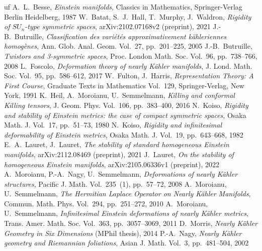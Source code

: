 \documentclass[12pt]{scrartcl}
\theoremstyle{plain}
\theoremstyle{definition}
\begin{document}
\begin{thebibliography}{uf}
 A.~L.~Besse, \emph{Einstein manifolds}, Classics in Mathematics, Springer-Verlag Berlin Heidelberg, 1987
 W.~Batat, S.~J.~Hall, T.~Murphy, J.~Waldron, \emph{Rigidity of $SU_n$-type symmetric spaces}, arXiv:2102.07168v2 (preprint), 2021
 J.-B.~Butruille, \emph{Classification des variétés approximativement kähleriennes homogènes}, Ann. Glob. Anal. Geom. Vol.~27, pp.~201--225, 2005
 J.-B.~Butruille, \emph{Twistors and 3-symmetric spaces}, Proc. London Math. Soc. Vol.~96, pp.~738--766, 2008
 L.~Foscolo, \emph{Deformation theory of nearly Kähler manifolds}, J. Lond. Math. Soc. Vol.~95, pp.~586--612, 2017
 W.~Fulton, J.~Harris, \emph{Representation Theory: A First Course}, Graduate Texts in Mathematics Vol.~129, Springer-Verlag, New York, 1991
 K.~Heil, A.~Moroianu, U.~Semmelmann, \emph{Killing and conformal Killing tensors}, J. Geom. Phys. Vol.~106, pp.~383--400, 2016
 N.~Koiso, \emph{Rigidity and stability of Einstein metrics: the case of compact symmetric spaces}, Osaka Math. J. Vol.~17, pp.~51--73, 1980
 N.~Koiso, \emph{Rigidity and infinitesimal deformability of Einstein metrics}, Osaka Math. J. Vol.~19, pp.~643--668, 1982
 E.~A.~Lauret, J.~Lauret, \emph{The stability of standard homogeneous Einstein manifolds}, arXiv:2112.08469 (preprint), 2021
 J.~Lauret, \emph{On the stability of homogeneous Einstein manifolds}, arXiv:2105.06336v1 (preprint), 2022
 A.~Moroianu, P.-A.~Nagy, U.~Semmelmann, \emph{Deformations of nearly Kähler structures}, Pacific J. Math. Vol.~235~(1), pp.~57--72, 2008
 A.~Moroianu, U.~Semmelmann, \emph{The Hermitian Laplace Operator on Nearly Kähler Manifolds}, Commun. Math. Phys. Vol.~294, pp.~251--272, 2010
 A.~Moroianu, U.~Semmelmann, \emph{Infinitesimal Einstein deformations of nearly Kähler metrics}, Trans. Amer. Math. Soc. Vol.~363, pp.~3057--3069, 2011
 D.~Morris, \emph{Nearly Kähler Geometry in Six Dimensions} (MPhil thesis), 2014
 P.-A.~Nagy, \emph{Nearly Kähler geometry and Riemannian foliations}, Asian J. Math. Vol.~3, pp.~481--504, 2002

\end{thebibliography}
\end{document}
